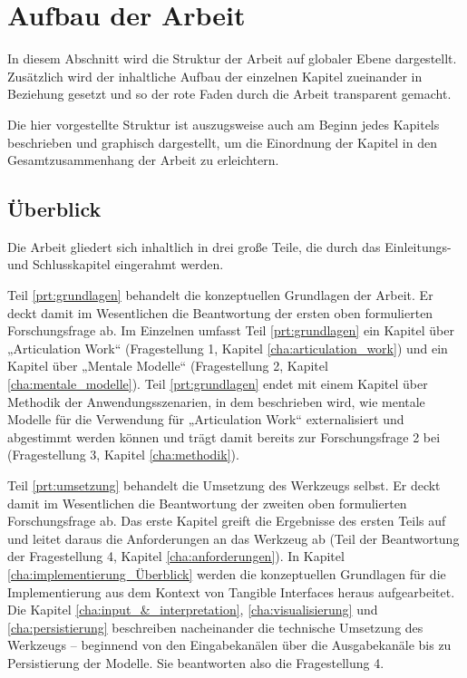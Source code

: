 
\section{Aufbau der Arbeit} %
\label{sec:aufbau_der_arbeit}

In diesem Abschnitt wird die Struktur der Arbeit auf globaler Ebene dargestellt. Zusätzlich wird der inhaltliche Aufbau der einzelnen Kapitel zueinander in Beziehung gesetzt und so der rote Faden durch die Arbeit transparent gemacht.

Die hier vorgestellte Struktur ist auszugsweise auch am Beginn jedes Kapitels beschrieben und graphisch dargestellt, um die Einordnung der Kapitel in den Gesamtzusammenhang der Arbeit zu erleichtern.

\subsection{Überblick} %
\label{sub:aufbau_ueberblick}

Die Arbeit gliedert sich inhaltlich in drei große Teile, die durch das Einleitungs- und Schlusskapitel eingerahmt werden.

Teil \ref{prt:grundlagen} behandelt die konzeptuellen Grundlagen der Arbeit. Er deckt damit im Wesentlichen die Beantwortung der ersten oben formulierten Forschungsfrage ab. Im Einzelnen umfasst Teil \ref{prt:grundlagen} ein Kapitel über „Articulation Work“ (Fragestellung 1, Kapitel \ref{cha:articulation_work}) und ein Kapitel über „Mentale Modelle“ (Fragestellung 2, Kapitel \ref{cha:mentale_modelle}). Teil \ref{prt:grundlagen} endet mit einem Kapitel über Methodik der Anwendungsszenarien, in dem beschrieben wird, wie mentale Modelle für die Verwendung für „Articulation Work“ externalisiert und abgestimmt werden können und trägt damit bereits zur Forschungsfrage 2 bei (Fragestellung 3, Kapitel \ref{cha:methodik}).

Teil \ref{prt:umsetzung} behandelt die Umsetzung des Werkzeugs selbst. Er deckt damit im Wesentlichen die Beantwortung der zweiten oben formulierten Forschungsfrage ab. Das erste Kapitel greift die Ergebnisse des ersten Teils auf und leitet daraus die Anforderungen an das Werkzeug ab (Teil der Beantwortung der Fragestellung 4, Kapitel \ref{cha:anforderungen}). In Kapitel \ref{cha:implementierung_Überblick} werden die konzeptuellen Grundlagen für die Implementierung aus dem Kontext von Tangible Interfaces heraus aufgearbeitet. Die Kapitel \ref{cha:input_&_interpretation}, \ref{cha:visualisierung} und \ref{cha:persistierung} beschreiben nacheinander die technische Umsetzung des Werkzeugs -- beginnend von den Eingabekanälen über die Ausgabekanäle bis zu Persistierung der Modelle. Sie beantworten also die Fragestellung 4. 


